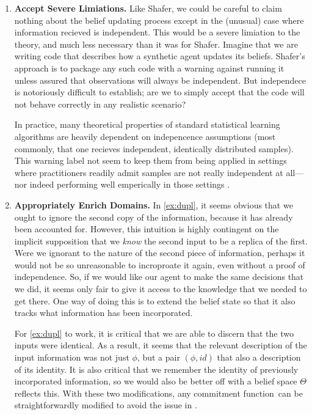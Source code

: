 \documentclass{uai2023}
\let\parencite\citep
\theoremstyle{plain}
\theoremstyle{definition}
\newcommand\cofunc{commitment function}
\begin{document}
\begin{enumerate}[label={\textbf{I\arabic*.}},ref={I\arabic*}]
	\item \textbf{Accept Severe Limiations.} \label{approach:assume}
	Like Shafer, we could be careful
to claim nothing about the belief updating process except in the (unusual) case where
	information recieved is independent.
This would be a severe limiation to the theory, and much less necessary than it was for Shafer.
	Imagine that we are writing code that describes how a synthetic agent updates its beliefs. Shafer's approach is to package any such code with a warning against running it unless assured that observations will always be independent.
	But independece is notoriously difficult to establish; are we to simply accept that the code will not behave correctly in any realistic scenario?


	In practice, many theoretical properties of standard statistical learning algorithms are heavily dependent on indepencence assumptions (most commonly, that one recieves independent, identically distributed samples).
This warning label not seem to keep them from being applied in settings where practitioners readily admit samples are not really independent at all---nor indeed performing well emperically in those settings \parencite{???}.




	\item \textbf{Appropriately Enrich Domains.}\label{approach:enrich}
In \cref{ex:dupl}, it seems obvious that we ought to ignore the second copy of the information, because it has already been accounted for.
	However, this intuition is highly contingent on the implicit supposition that we \emph{know} the second input to be a replica of the first.
	Were we ignorant to the nature of the second piece of information, perhaps it would not be so unreasonable to incroproate it again, even without a proof of independence.
So, if we would like our agent to make the same decisions that we did, it seems only fair to give it access to the knowledge that we needed to get there.
	One way of doing this is to extend the belief state so that it also tracks what information has been incorporated.


	For \cref{ex:dupl} to work, it is critical that we are able to discern that the two inputs were identical.
	As a result, it seems that the relevant description of the input information was not just $\phi$, but a pair $(\phi, \mathit{id})$ that also a description of its identity.
	It is also critical that we remember the identity of previously incorporated information, so we would also be better off with a belief space $\Theta$ reflects this.
	With these two modifications, any \cofunc\ can be straightforwardly modified to avoid the issue in .



\end{enumerate}
\end{document}
